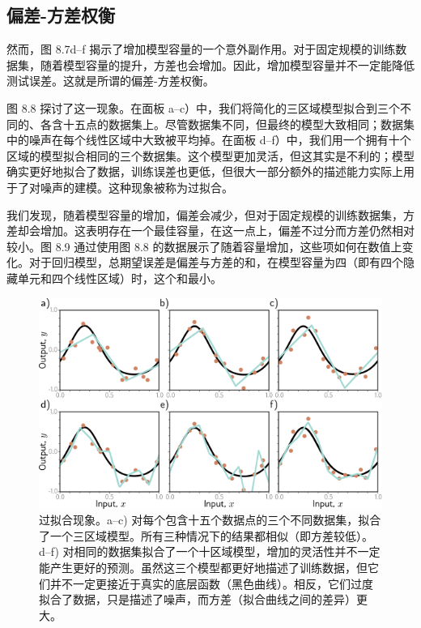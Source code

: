 \subsection{偏差-方差权衡}
然而，图 8.7d–f 揭示了增加模型容量的一个意外副作用。对于固定规模的训练数据集，随着模型容量的提升，方差也会增加。因此，增加模型容量并不一定能降低测试误差。这就是所谓的偏差-方差权衡。

图 8.8 探讨了这一现象。在面板 a–c）中，我们将简化的三区域模型拟合到三个不同的、各含十五点的数据集上。尽管数据集不同，但最终的模型大致相同；数据集中的噪声在每个线性区域中大致被平均掉。在面板 d–f）中，我们用一个拥有十个区域的模型拟合相同的三个数据集。这个模型更加灵活，但这其实是不利的；模型确实更好地拟合了数据，训练误差也更低，但很大一部分额外的描述能力实际上用于了对噪声的建模。这种现象被称为过拟合。

我们发现，随着模型容量的增加，偏差会减少，但对于固定规模的训练数据集，方差却会增加。这表明存在一个最佳容量，在这一点上，偏差不过分而方差仍然相对较小。图 8.9 通过使用图 8.8 的数据展示了随着容量增加，这些项如何在数值上变化。对于回归模型，总期望误差是偏差与方差的和，在模型容量为四（即有四个隐藏单元和四个线性区域）时，这个和最小。

\begin{figure}[ht!]
\centering
\includegraphics[width=0.7\linewidth]{png/chapter8/PerfCapacityVariance.png}
\caption{过拟合现象。a–c) 对每个包含十五个数据点的三个不同数据集，拟合了一个三区域模型。所有三种情况下的结果都相似（即方差较低）。d–f) 对相同的数据集拟合了一个十区域模型，增加的灵活性并不一定能产生更好的预测。虽然这三个模型都更好地描述了训练数据，但它们并不一定更接近于真实的底层函数（黑色曲线）。相反，它们过度拟合了数据，只是描述了噪声，而方差（拟合曲线之间的差异）更大。}
\end{figure}


